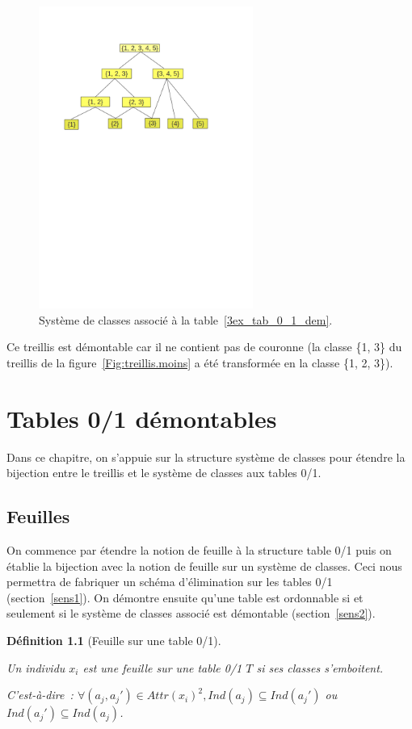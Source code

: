 \documentclass[a4paper]{report}
\newtheorem{definition}{Définition}[chapter]
\begin{document}
\begin{figure}
\begin{center}
\includegraphics[width=7cm]{images/treillismoins2}
\end{center}
\caption{ Système de classes associé à la table~\ref{3ex_tab_0_1_dem}.}
\label{figure_treillis_associe}
\end{figure}
Ce treillis est démontable car il ne contient pas de couronne (la classe \{1, 3\} du treillis de la figure~\ref{Fig:treillis.moins} a été transformée en la classe \{1, 2, 3\}).

\chapter{Tables 0/1 démontables}

Dans ce chapitre, on s'appuie sur la structure système de classes pour étendre la bijection entre le treillis et le système de classes aux tables 0/1.
\label{results}

\section{Feuilles}

On commence par étendre la notion de feuille à la structure table 0/1 puis on établie la bijection avec la notion de feuille sur un système de classes. 
Ceci nous permettra de fabriquer un schéma d'élimination sur les tables 0/1 (section~\ref{sens1}). On démontre ensuite qu'une table est ordonnable 
si et seulement si le système de classes associé est démontable (section~\ref{sens2}).
\begin{definition}[Feuille sur une table 0/1]

\label{feuilletable}

Un individu $x_i$ est une feuille sur une table 0/1 $T$ si ses classes s'emboitent.

C'est-à-dire~:
$\forall (a_j, a_j') \in Attr(x_i)^2, Ind(a_j) \subseteq Ind(a_j')$ ou $Ind(a_j') \subseteq Ind(a_j)$.

\end{definition}
\end{document}
